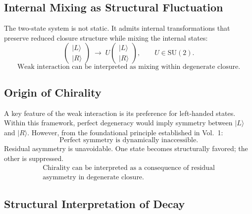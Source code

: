 \subsection{Internal Mixing as Structural Fluctuation}

The two-state system is not static.
It admits internal transformations that preserve reduced closure structure
while mixing the internal states:
\begin{equation}
  \begin{pmatrix}|L\rangle\\|R\rangle\end{pmatrix}
  \;\longrightarrow\;
  U\begin{pmatrix}|L\rangle\\|R\rangle\end{pmatrix},
  \qquad U \in \mathrm{SU}(2).
\end{equation}
\begin{equation}
  \boxed{
    \text{Weak interaction can be interpreted as mixing within
    degenerate closure.}
  }
\end{equation}

\subsection{Origin of Chirality}

A key feature of the weak interaction is its preference for left-handed states.
Within this framework, perfect degeneracy would imply symmetry
between $|L\rangle$ and $|R\rangle$.
However, from the foundational principle established in Vol.~1:
\begin{equation}
  \boxed{\text{Perfect symmetry is dynamically inaccessible.}}
\end{equation}
Residual asymmetry is unavoidable.
One state becomes structurally favored; the other is suppressed.
\begin{equation}
  \boxed{\begin{gathered}
    \text{Chirality can be interpreted as a consequence of residual} \\
    \text{asymmetry in degenerate closure.}
  \end{gathered}}
\end{equation}

\subsection{Structural Interpretation of Decay}


